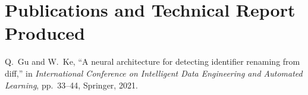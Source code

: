 \chapter{Publications and Technical Report Produced}
\label{sec:produced-publications}

Q.~Gu and W.~Ke, ``A neural architecture for detecting identifier renaming from
diff,'' in {\em International Conference on Intelligent Data Engineering and
Automated Learning}, pp.~33--44, Springer, 2021.